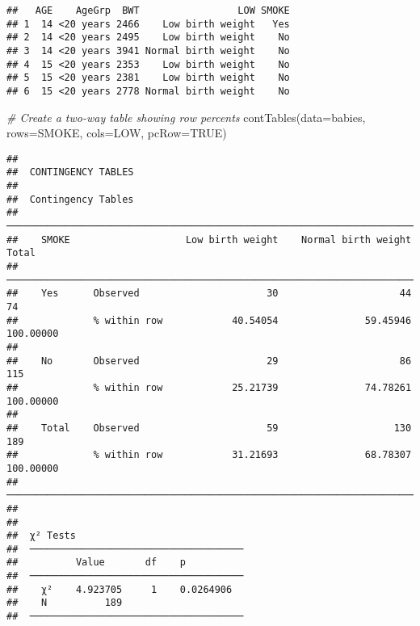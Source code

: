 \documentclass[
]{memoir}
\newenvironment{Shaded}{\begin{snugshade}}{\end{snugshade}}
\newcommand{\AttributeTok}[1]{\textcolor[rgb]{0.77,0.63,0.00}{#1}}
\newcommand{\CommentTok}[1]{\textcolor[rgb]{0.56,0.35,0.01}{\textit{#1}}}
\newcommand{\ConstantTok}[1]{\textcolor[rgb]{0.00,0.00,0.00}{#1}}
\newcommand{\FunctionTok}[1]{\textcolor[rgb]{0.00,0.00,0.00}{#1}}
\newcommand{\NormalTok}[1]{#1}
\begin{document}
\begin{verbatim}
##   AGE    AgeGrp  BWT                 LOW SMOKE
## 1  14 <20 years 2466    Low birth weight   Yes
## 2  14 <20 years 2495    Low birth weight    No
## 3  14 <20 years 3941 Normal birth weight    No
## 4  15 <20 years 2353    Low birth weight    No
## 5  15 <20 years 2381    Low birth weight    No
## 6  15 <20 years 2778 Normal birth weight    No
\end{verbatim}

\begin{Shaded}
\begin{Highlighting}[]
\CommentTok{\# Create a two{-}way table showing row percents}
\FunctionTok{contTables}\NormalTok{(}\AttributeTok{data=}\NormalTok{babies, }\AttributeTok{rows=}\NormalTok{SMOKE, }\AttributeTok{cols=}\NormalTok{LOW, }\AttributeTok{pcRow=}\ConstantTok{TRUE}\NormalTok{)}
\end{Highlighting}
\end{Shaded}

\begin{verbatim}
## 
##  CONTINGENCY TABLES
## 
##  Contingency Tables                                                                
##  ───────────────────────────────────────────────────────────────────────────────── 
##    SMOKE                    Low birth weight    Normal birth weight    Total       
##  ───────────────────────────────────────────────────────────────────────────────── 
##    Yes      Observed                      30                     44           74   
##             % within row            40.54054               59.45946    100.00000   
##                                                                                    
##    No       Observed                      29                     86          115   
##             % within row            25.21739               74.78261    100.00000   
##                                                                                    
##    Total    Observed                      59                    130          189   
##             % within row            31.21693               68.78307    100.00000   
##  ───────────────────────────────────────────────────────────────────────────────── 
## 
## 
##  χ² Tests                              
##  ───────────────────────────────────── 
##          Value       df    p           
##  ───────────────────────────────────── 
##    χ²    4.923705     1    0.0264906   
##    N          189                      
##  ─────────────────────────────────────
\end{verbatim}
\end{document}

